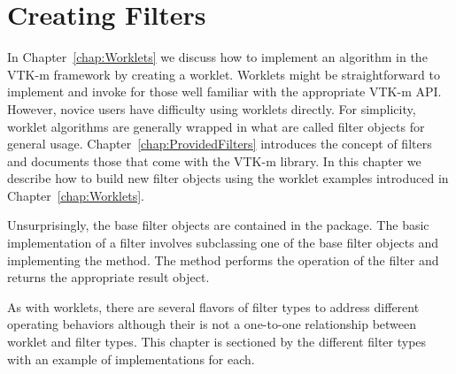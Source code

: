 
\chapter{Creating Filters}
\label{chap:CreatingFilters}

In Chapter~\ref{chap:Worklets} we discuss how to implement an algorithm in the VTK-m framework by creating a worklet.
Worklets might be straightforward to implement and invoke for those well familiar with the appropriate VTK-m API.
However, novice users have difficulty using worklets directly.
For simplicity, worklet algorithms are generally wrapped in what are called filter objects for general usage.
Chapter~\ref{chap:ProvidedFilters} introduces the concept of filters and documents those that come with the VTK-m library.
In this chapter we describe how to build new filter objects using the worklet examples introduced in Chapter~\ref{chap:Worklets}.

Unsurprisingly, the base filter objects are contained in the \vtkmfilter{} package.
The basic implementation of a filter involves subclassing one of the base filter objects and implementing the  method.
The  method performs the operation of the filter and returns the appropriate result object.

As with worklets, there are several flavors of filter types to address different operating behaviors although their is not a one-to-one relationship between worklet and filter types.
This chapter is sectioned by the different filter types with an example of implementations for each.
